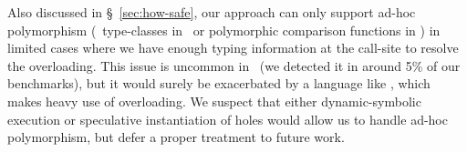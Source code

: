 Also discussed in \S~\ref{sec:how-safe}, our approach can only support
ad-hoc polymorphism (\eg\ type-classes in \haskell\ or polymorphic
comparison functions in \ocaml) in limited cases where we have enough
typing information at the call-site to resolve the overloading. This
issue is uncommon in \ocaml\ (we detected it in around 5\% of our
benchmarks), but it would surely be exacerbated by a language like
\haskell, which makes heavy use of overloading. We suspect that either
dynamic-symbolic execution or speculative instantiation of holes would
allow us to handle ad-hoc polymorphism, but defer a proper treatment to
future work.


